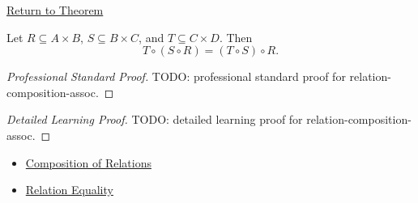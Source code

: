 \newpage
{}
\label{prf:relation-composition-assoc}

\begin{remark*}[Return]
\hyperref[thm:relation-composition-assoc]{Return to Theorem}
\end{remark*}

\begin{theorem*}
Let $R\subseteq A\times B$, $S\subseteq B\times C$, and
$T\subseteq C\times D$. Then
\[
T\circ(S\circ R)=(T\circ S)\circ R.
\]
\end{theorem*}

\begin{proof}[Professional Standard Proof]
\LRAProofBodyStart
TODO: professional standard proof for relation-composition-assoc.
\end{proof}

\begin{proof}[Detailed Learning Proof]
\LRAProofBodyStart
TODO: detailed learning proof for relation-composition-assoc.
\end{proof}

\begin{remark*}

\end{remark*}

\begin{dependencies}
\begin{itemize}
  \item \hyperref[def:relation-composition]{Composition of Relations}
  \item \hyperref[def:relation-equality]{Relation Equality}
\end{itemize}
\end{dependencies}

\clearpage
